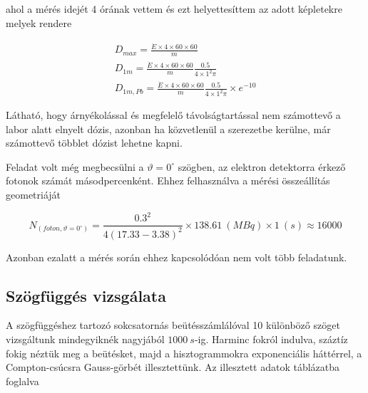 \documentclass[a4paper,12pt]{article}
\begin{document}
ahol a mérés idejét 4 órának vettem és ezt helyettesíttem az adott képletekre melyek rendere

\begin{gather*}
D_{max} = \frac{\dot{E}\times 4\times 60\times 60}{m} \\
D_{1m} = \frac{\dot{E}\times 4\times 60\times 60}{m} \frac{0.5}{4\times 1^{2} \pi} \\
D_{1m, Pb} = \frac{\dot{E}\times 4\times 60\times 60}{m} \frac{0.5}{4\times 1^{2} \pi} \times e^{-10}
\end{gather*}

\par Látható, hogy árnyékolással és megfelelő távolságtartással nem számottevő a labor alatt elnyelt dózis, azonban ha közvetlenül a szerezetbe kerülne, már számottevő többlet dózist lehetne kapni.

\par Feladat volt még megbecsülni a $\vartheta = 0^{\circ}$ szögben, az elektron detektorra érkező fotonok számát másodpercenként. Ehhez felhasználva a mérési összeállítás geometriáját

\begin{equation*}
	N_{(foton, \vartheta = 0^{\circ})} = \frac{0.3^{2}}{4(17.33-3.38)^{2}}\times 138.61 ~(MBq) \times 1 ~(s) \approx 16 000
\end{equation*} 

\par Azonban ezalatt a mérés során ehhez kapcsolódóan nem volt több feladatunk.

\subsection{Szögfüggés vizsgálata}

\par A szögfüggéshez tartozó sokcsatornás beütésszámlálóval 10 különböző szöget vizsgáltunk mindegyiknék nagyjából $1000~s$-ig. Harminc fokról indulva, száztíz fokig néztük meg a beütésket, majd a hisztogrammokra exponenciális háttérrel, a Compton-csúcsra Gauss-görbét illesztettünk. Az illesztett adatok táblázatba foglalva
\end{document}
